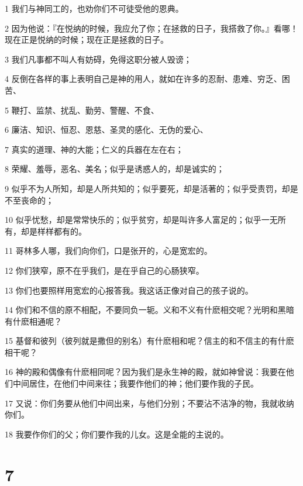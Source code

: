 \par 1 我们与神同工的，也劝你们不可徒受他的恩典。
\par 2 因为他说：『在悦纳的时候，我应允了你；在拯救的日子，我搭救了你。』看哪！现在正是悦纳的时候；现在正是拯救的日子。
\par 3 我们凡事都不叫人有妨碍，免得这职分被人毁谤；
\par 4 反倒在各样的事上表明自己是神的用人，就如在许多的忍耐、患难、穷乏、困苦、
\par 5 鞭打、监禁、扰乱、勤劳、警醒、不食、
\par 6 廉洁、知识、恒忍、恩慈、圣灵的感化、无伪的爱心、
\par 7 真实的道理、神的大能；仁义的兵器在左在右；
\par 8 荣耀、羞辱，恶名、美名；似乎是诱惑人的，却是诚实的；
\par 9 似乎不为人所知，却是人所共知的；似乎要死，却是活著的；似乎受责罚，却是不至丧命的；
\par 10 似乎忧愁，却是常常快乐的；似乎贫穷，却是叫许多人富足的；似乎一无所有，却是样样都有的。
\par 11 哥林多人哪，我们向你们，口是张开的，心是宽宏的。
\par 12 你们狭窄，原不在乎我们，是在乎自己的心肠狭窄。
\par 13 你们也要照样用宽宏的心报答我。我这话正像对自己的孩子说的。
\par 14 你们和不信的原不相配，不要同负一轭。义和不义有什麽相交呢？光明和黑暗有什麽相通呢？
\par 15 基督和彼列（彼列就是撒但的别名）有什麽相和呢？信主的和不信主的有什麽相干呢？
\par 16 神的殿和偶像有什麽相同呢？因为我们是永生神的殿，就如神曾说：我要在他们中间居住，在他们中间来往；我要作他们的神；他们要作我的子民。
\par 17 又说：你们务要从他们中间出来，与他们分别；不要沾不洁净的物，我就收纳你们。
\par 18 我要作你们的父；你们要作我的儿女。这是全能的主说的。

\chapter{7}

